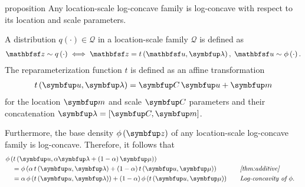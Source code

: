 \begin{theoremEnd}{proposition}\label{thm:logconcave_parameter}
  Any location-scale log-concave family is log-concave with respect to its location and scale parameters.
\end{theoremEnd}
\begin{proofEnd}
  A distribution \(q\left(\cdot\right) \in \mathcal{Q}\) in a location-scale family \(\mathcal{Q}\) is defined as
  \begin{align*}
    \rvvz \sim q\left(\cdot\right) \iff \rvvz = t\left(\rvvu, \vlambda\right),\; \rvvu \sim \phi\left(\cdot\right).
  \end{align*}
  The reparameterization function \(t\) is defined as an affine transformation
  \begin{align*}
    t\left(\vu, \vlambda\right) = \mC\,\vu + \vm
  \end{align*}
  for the location \(\vm\) and scale \(\mC\) parameters and their concatenation \(\vlambda = \left[\mC, \vm\right]\).

  Furthermore, the base density \(\phi\left(\vz\right)\) of any location-scale log-concave family is log-concave.
  Therefore, it follows that
  \begin{alignat}{2}
    &\phi\left(t\left(\vu, \alpha \vlambda + (1 - \alpha)\,\vmu\right)\right)
    \nonumber
    \\
    &\quad=
    \phi\left( \alpha\,t\left(\vu, \vlambda\right) + (1 - \alpha)\,t\left(\vu, \vmu\right)\right)
    &&\quad\text{\textit{\cref{thm:additive}}}
    \nonumber
    \\
    &\quad=
    \alpha\,\phi\left(t\left(\vu, \vlambda\right)\right) + (1 - \alpha)\,\phi\left(t\left(\vu, \vmu\right)\right)
    &&\quad\text{\textit{Log-concavity of \(\phi\)}}.
    \nonumber
  \end{alignat}
\end{proofEnd}

